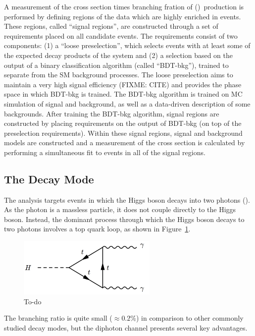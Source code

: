 A measurement of the cross section times branching fration of \ttH (\Hgg)~production is performed by defining regions of the data which are highly enriched in \ttH events. These regions, called ``signal regions'', are constructed through a set of requirements placed on all candidate events. 
The requirements consist of two components: 
(1) a ``loose preselection'', which selects events with at least some of the expected decay products of the \ttH system and 
(2) a selection based on the output of a binary classification algorithm (called ``BDT-bkg''), trained to separate \ttH from the SM background processes. The loose preselection aims to maintain a very high signal efficiency (FIXME: CITE) and provides the phase space in which BDT-bkg is trained.
The BDT-bkg algorithm is trained on MC simulation of signal and background, as well as a data-driven description of some backgrounds. After training the BDT-bkg algorithm, signal regions are constructed by placing requirements on the output of BDT-bkg (on top of the preselection requirements).
Within these signal regions, signal and background models are constructed and a measurement of the \ttH cross section is calculated by performing a simultaneous fit to events in all of the signal regions. 
%
\subsection{The \Hgg Decay Mode}
The analysis targets \ttH events in which the Higgs boson decays into two photons (\Hgg). As the photon is a massless particle, it does not couple directly to the Higgs boson.
Instead, the dominant process through which the Higgs boson decays to two photons involves a top quark loop, as shown in Figure~\ref{fig:hgg_feynman}.
\begin{figure}[h!]
    \centering
    \includegraphics[width=0.6\textwidth]{figures/feynman_diagrams/hgg}
    \caption{To-do}
    \label{fig:hgg_feynman}
\end{figure}
The \Hgg branching ratio is quite small ($\approx 0.2\%$) in comparison to other commonly studied decay modes, but the diphoton channel presents several key advantages.

